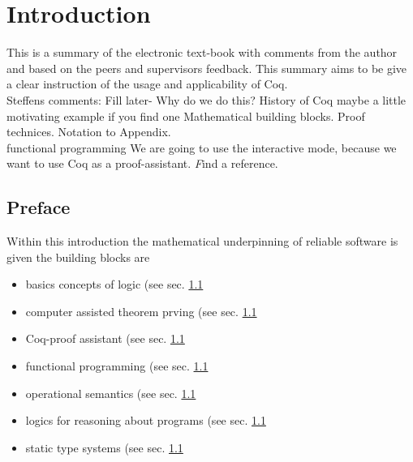 \section{Introduction}


This is a summary of the electronic text-book \cite{PACGGHSY} with comments from the author and based on the peers and supervisors feedback.
This summary aims to be give a clear instruction of the usage and applicability of Coq.\\

    
Steffens comments:
Fill later-
 Why do we do this?
 History of Coq
 maybe a little motivating example if you find one
 Mathematical building blocks. Proof technices. Notation to Appendix.\\
 \gls{functional programming}
We are going to use the interactive mode, because we want to use Coq as a proof-assistant. {\emph Find a reference.}

\subsection{Preface}
Within this introduction the mathematical underpinning of reliable software is given the building blocks are
\begin{itemize}
\item basics concepts of logic (see sec. \ref{} %
\item computer assisted theorem prving (see sec. \ref{} %
\item Coq-proof assistant (see sec. \ref{} %
\item functional programming (see sec. \ref{} %
\item operational semantics (see sec. \ref{} %
\item logics for reasoning about programs (see sec. \ref{} %
\item static type systems (see sec. \ref{} %
\end{itemize} 

